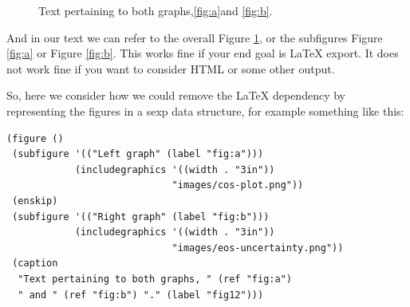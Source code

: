 \documentclass[11pt]{article}
\begin{document}
\begin{figure}
\enskip %
\caption{Text pertaining to both graphs,\ref{fig:a}and \ref{fig:b}. \label{fig12}}
\end{figure}

And in our text we can refer to the overall Figure \ref{fig12}, or the subfigures Figure \ref{fig:a} or Figure \ref{fig:b}. This works fine if your end goal is \LaTeX{} export. It does not work fine if you want to consider HTML or some other output.

So, here we consider how we could remove the \LaTeX{} dependency by representing the figures in a sexp data structure, for example something like this:

\begin{verbatim}
(figure ()
 (subfigure '(("Left graph" (label "fig:a")))
            (includegraphics '((width . "3in"))
                             "images/cos-plot.png"))
 (enskip)
 (subfigure '(("Right graph" (label "fig:b")))
            (includegraphics '((width . "3in"))
                             "images/eos-uncertainty.png"))
 (caption
  "Text pertaining to both graphs, " (ref "fig:a")
  " and " (ref "fig:b") "." (label "fig12")))
\end{verbatim}
\end{document}
